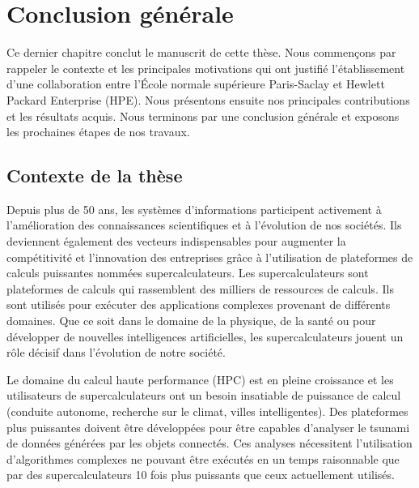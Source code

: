 \chapter{Conclusion générale}
\label{chap:conclusion}

    Ce dernier chapitre conclut le manuscrit de cette thèse. Nous commençons par rappeler le contexte et les principales motivations qui ont justifié l'établissement d'une collaboration entre l'École normale supérieure Paris-Saclay et Hewlett Packard Enterprise (HPE). Nous présentons ensuite nos principales contributions et les résultats acquis. Nous terminons par une conclusion générale et exposons les prochaines étapes de nos travaux.
      

\section{Contexte de la thèse}
        
 
    
        Depuis plus de 50 ans, les systèmes d’informations participent activement à l’amélioration des connaissances scientifiques et à l’évolution de nos sociétés. Ils deviennent également des vecteurs indispensables pour augmenter la compétitivité et l’innovation des entreprises grâce à l'utilisation de plateformes de calculs puissantes nommées supercalculateurs. Les supercalculateurs sont plateformes de calculs qui rassemblent des milliers de ressources de calculs. Ils sont utilisés pour exécuter des applications complexes provenant de différents domaines. Que ce soit dans le domaine de la physique, de la santé ou pour développer de nouvelles intelligences artificielles, les supercalculateurs jouent un rôle décisif dans l'évolution de notre société.
 
 
        
        Le domaine du calcul haute performance (HPC) est en pleine croissance et les utilisateurs de supercalculateurs ont un besoin insatiable de puissance de calcul (conduite autonome, recherche sur le climat, villes intelligentes). Des plateformes plus puissantes doivent être développées pour être capables d'analyser le tsunami de données générées par les objets connectés. Ces analyses nécessitent l'utilisation d'algorithmes complexes ne pouvant être exécutés en un temps raisonnable que par des supercalculateurs 10 fois plus puissants que ceux actuellement utilisés. 
       
